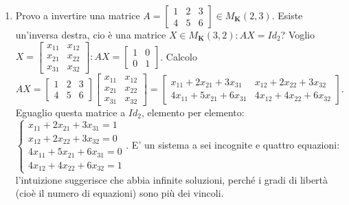 \documentclass{article}
\begin{document}
\begin{enumerate}
\item Provo a invertire una matrice $A=\left[ 
\begin{array}{ccc}
1 & 2 & 3 \\ 
4 & 5 & 6%
\end{array}%
\right] \in M_{\mathbf{K}}\left( 2,3\right) $. Esiste un'inversa destra, cio%
\`{e} una matrice $X\in M_{\mathbf{K}}\left( 3,2\right) :AX=Id_{2}$? Voglio $%
X=\left[ 
\begin{array}{cc}
x_{11} & x_{12} \\ 
x_{21} & x_{22} \\ 
x_{31} & x_{32}%
\end{array}%
\right] :AX=\left[ 
\begin{array}{cc}
1 & 0 \\ 
0 & 1%
\end{array}%
\right] $. Calcolo $AX=\left[ 
\begin{array}{ccc}
1 & 2 & 3 \\ 
4 & 5 & 6%
\end{array}%
\right] \left[ 
\begin{array}{cc}
x_{11} & x_{12} \\ 
x_{21} & x_{22} \\ 
x_{31} & x_{32}%
\end{array}%
\right] =\left[ 
\begin{array}{cc}
x_{11}+2x_{21}+3x_{31} & x_{12}+2x_{22}+3x_{32} \\ 
4x_{11}+5x_{21}+6x_{31} & 4x_{12}+4x_{22}+6x_{32}%
\end{array}%
\right] $. Eguaglio questa matrice a $Id_{2}$, elemento per elemento: $%
\left\{ 
\begin{array}{c}
x_{11}+2x_{21}+3x_{31}=1 \\ 
x_{12}+2x_{22}+3x_{32}=0 \\ 
4x_{11}+5x_{21}+6x_{31}=0 \\ 
4x_{12}+4x_{22}+6x_{32}=1%
\end{array}%
\right. $. E' un sistema a sei incognite e quattro equazioni: l'intuizione
suggerisce che abbia infinite soluzioni, perch\'{e} i gradi di libert\`{a}
(cio\`{e} il numero di equazioni) sono pi\`{u} dei vincoli.


\end{enumerate}
\end{document}
